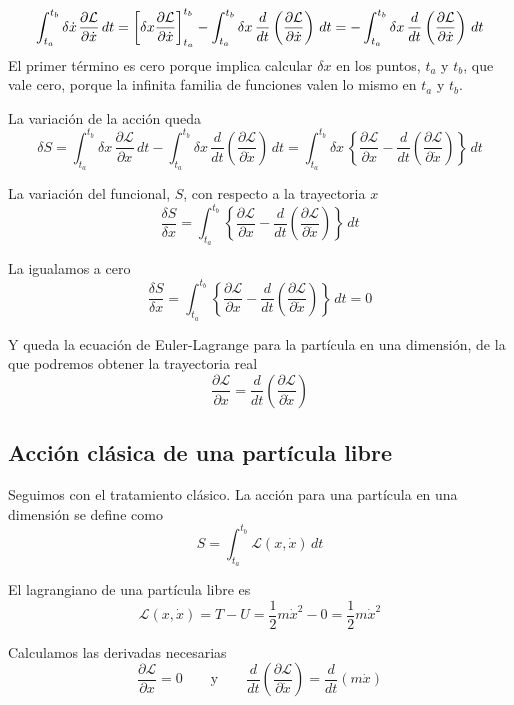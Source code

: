 \[
  \int_{t_a}^{t_b}
  \delta\dot{x}\kern1pt\dfrac{\partial\mathcal{L}}{\partial\dot{x}}\,dt
  = \left[\delta x \dfrac{\partial\mathcal{L}}{\partial\dot{x}}\right]_{t_a}^{t_b}
  - \int_{t_a}^{t_b}
  \delta x\,\dfrac{d}{dt} \left(\dfrac{\partial\mathcal{L}}{\partial\dot{x}}\right)\,dt
  =
  - \int_{t_a}^{t_b}
  \delta x\,\dfrac{d}{dt} \left(\dfrac{\partial\mathcal{L}}{\partial\dot{x}}\right)\,dt
\]
El primer término es cero porque implica calcular $\delta
x$ en los puntos, $t_a$ y
$t_b$, que vale cero, porque la infinita familia de funciones valen lo
mismo en $t_a$ y $t_b$.

La variación de la acción queda
\[
  \delta S
  =
  \int_{t_a}^{t_b} \delta x\,\dfrac{\partial\mathcal{L}}{\partial x}\,dt
  - \int_{t_a}^{t_b}
  \delta x\,\dfrac{d}{dt} \left(\dfrac{\partial\mathcal{L}}{\partial\dot{x}}\right)\,dt
  =
  \int_{t_a}^{t_b} \delta x\,
  \left\{\dfrac{\partial\mathcal{L}}{\partial x}
  - \dfrac{d}{dt} \left(\dfrac{\partial\mathcal{L}}{\partial\dot{x}}\right)\right\}\,dt
\]

La variación del funcional, $S$, con respecto a la trayectoria $x$
\[
  \dfrac{\delta S}{\delta x}
  =
  \int_{t_a}^{t_b} 
  \left\{\dfrac{\partial\mathcal{L}}{\partial x}
  - \dfrac{d}{dt} \left(\dfrac{\partial\mathcal{L}}{\partial\dot{x}}\right)\right\}\,dt
\]

La igualamos a cero
\[
    \dfrac{\delta S}{\delta x}
  =
  \int_{t_a}^{t_b} 
  \left\{\dfrac{\partial\mathcal{L}}{\partial x}
    - \dfrac{d}{dt} \left(\dfrac{\partial\mathcal{L}}{\partial\dot{x}}\right)\right\}\,dt
  = 0
\]

Y queda la ecuación de Euler-Lagrange para la partícula en una
dimensión, de la que podremos obtener la trayectoria real
\[
  \dfrac{\partial\mathcal{L}}{\partial x}
    = \dfrac{d}{dt} \left(\dfrac{\partial\mathcal{L}}{\partial\dot{x}}\right)
\]

\subsection{Acción clásica de una partícula libre}

Seguimos con el tratamiento clásico. La acción para una partícula en
una dimensión se define como
\[
  S
  =
  \int_{t_a}^{t_b} \mathcal{L}(x, \dot{x})\,dt
\]

El lagrangiano de una partícula libre es
\[
  \mathcal{L}(x,\dot{x})
  =
  T - U
  =
  \dfrac{1}{2}m\dot{x}^2 - 0
  =
  \dfrac{1}{2}m\dot{x}^2
\]

Calculamos las derivadas necesarias
\[
  \dfrac{\partial\mathcal{L}}{\partial x}
  =
  0
  \hspace{2em}\text{y}\hspace{2em}
  \dfrac{d}{dt}\left(\dfrac{\partial\mathcal{L}}{\partial\dot{x}}\right)
    =
    \dfrac{d}{dt} (m\dot{x})
\]

